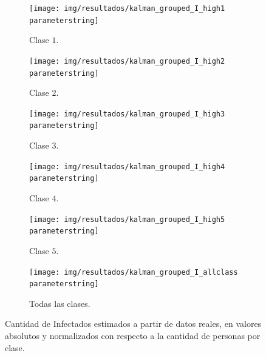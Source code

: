 \begin{figure}
     \centering
     \begin{subfigure}[b]{0.47\textwidth}
         \centering
         \texttt{[image: img/resultados/kalman\_grouped\_I\_high1\\parameterstring]}
         \caption{Clase \(1\).}
     \end{subfigure}
     \hfill
     \begin{subfigure}[b]{.47\textwidth}
         \centering
         \texttt{[image: img/resultados/kalman\_grouped\_I\_high2\\parameterstring]}
         \caption{Clase \(2\).}
     \end{subfigure}
     \hfill
     \begin{subfigure}[b]{.47\textwidth}
         \centering
         \texttt{[image: img/resultados/kalman\_grouped\_I\_high3\\parameterstring]}
         \caption{Clase \(3\).}
     \end{subfigure}
     \hfill
     \begin{subfigure}[b]{.47\textwidth}
         \centering
         \texttt{[image: img/resultados/kalman\_grouped\_I\_high4\\parameterstring]}
         \caption{Clase \(4\).}
     \end{subfigure}
     \hfill
     \begin{subfigure}[b]{.47\textwidth}
         \centering
         \texttt{[image: img/resultados/kalman\_grouped\_I\_high5\\parameterstring]}
         \caption{Clase \(5\).}
     \end{subfigure}
     \hfill
     \begin{subfigure}[b]{.47\textwidth}
         \centering
         \texttt{[image: img/resultados/kalman\_grouped\_I\_allclass\\parameterstring]}
         \caption{Todas las clases.}
     \end{subfigure}
        \caption{Cantidad de Infectados estimados a partir de datos reales, en valores absolutos y normalizados con respecto a la cantidad de personas por clase.}
        \label{e-comp-high}
\end{figure}



